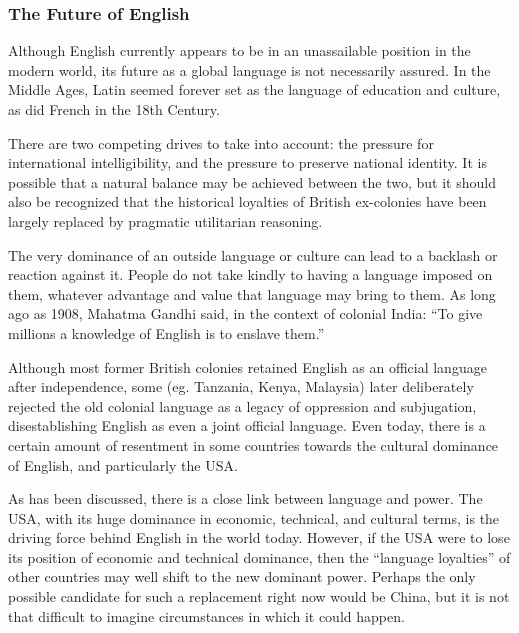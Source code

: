 \documentclass[../main.tex]{subfiles}
\begin{document}
        \subsubsection{The Future of English}
        Although English currently appears to be in an unassailable position in the modern world, its future as a global language is not necessarily assured. In the Middle Ages, Latin seemed forever set as the language of education and culture, as did French in the 18th Century. \par 
        There are two competing drives to take into account: the pressure for international intelligibility, and the pressure to preserve national identity. It is possible that a natural balance may be achieved between the two, but it should also be recognized that the historical loyalties of British ex-colonies have been largely replaced by pragmatic utilitarian reasoning. \par 
        The very dominance of an outside language or culture can lead to a backlash or reaction against it. People do not take kindly to having a language imposed on them, whatever advantage and value that language may bring to them. As long ago as 1908, Mahatma Gandhi said, in the context of colonial India: ``To give millions a knowledge of English is to enslave them.'' \par
        Although most former British colonies retained English as an official language after independence, some (eg. Tanzania, Kenya, Malaysia) later deliberately rejected the old colonial language as a legacy of oppression and subjugation, disestablishing English as even a joint official language. Even today, there is a certain amount of resentment in some countries towards the cultural dominance of English, and particularly the USA. \par 
        As has been discussed, there is a close link between language and power. The USA, with its huge dominance in economic, technical, and cultural terms, is the driving force behind English in the world today. However, if the USA were to lose its position of economic and technical dominance, then the ``language loyalties'' of other countries may well shift to the new dominant power. Perhaps the only possible candidate for such a replacement right now would be China, but it is not that difficult to imagine circumstances in which it could happen. \par 
\end{document}
